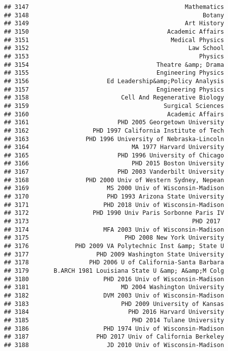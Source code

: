 \documentclass[
]{article}
\begin{document}
\begin{verbatim}
## 3147                                            Mathematics
## 3148                                                 Botany
## 3149                                            Art History
## 3150                                       Academic Affairs
## 3151                                        Medical Physics
## 3152                                             Law School
## 3153                                                Physics
## 3154                                    Theatre &amp; Drama
## 3155                                    Engineering Physics
## 3156                      Ed Leadership&amp;Policy Analysis
## 3157                                    Engineering Physics
## 3158                          Cell And Regenerative Biology
## 3159                                      Surgical Sciences
## 3160                                       Academic Affairs
## 3161                         PHD 2005 Georgetown University
## 3162                  PHD 1997 California Institute of Tech
## 3163                PHD 1996 University of Nebraska-Lincoln
## 3164                             MA 1977 Harvard University
## 3165                         PHD 1996 University of Chicago
## 3166                             PHD 2015 Boston University
## 3167                         PHD 2003 Vanderbilt University
## 3168                PHD 2000 Univ of Western Sydney, Nepean
## 3169                      MS 2000 Univ of Wisconsin-Madison
## 3170                      PHD 1993 Arizona State University
## 3171                     PHD 2018 Univ of Wisconsin-Madison
## 3172                  PHD 1990 Univ Paris Sorbonne Paris IV
## 3173                                              PHD 2017 
## 3174                     MFA 2003 Univ of Wisconsin-Madison
## 3175                           PHD 2008 New York University
## 3176             PHD 2009 VA Polytechnic Inst &amp; State U
## 3177                   PHD 2009 Washington State University
## 3178                 PHD 2006 U of California-Santa Barbara
## 3179       B.ARCH 1981 Louisiana State U &amp; A&amp;M Colg
## 3180                     PHD 2016 Univ of Wisconsin-Madison
## 3181                          MD 2004 Washington University
## 3182                     DVM 2003 Univ of Wisconsin-Madison
## 3183                          PHD 2009 University of Kansas
## 3184                            PHD 2016 Harvard University
## 3185                             PHD 2014 Tulane University
## 3186                     PHD 1974 Univ of Wisconsin-Madison
## 3187                   PHD 2017 Univ of California Berkeley
## 3188                      JD 2010 Univ of Wisconsin-Madison

\end{verbatim}
\end{document}
